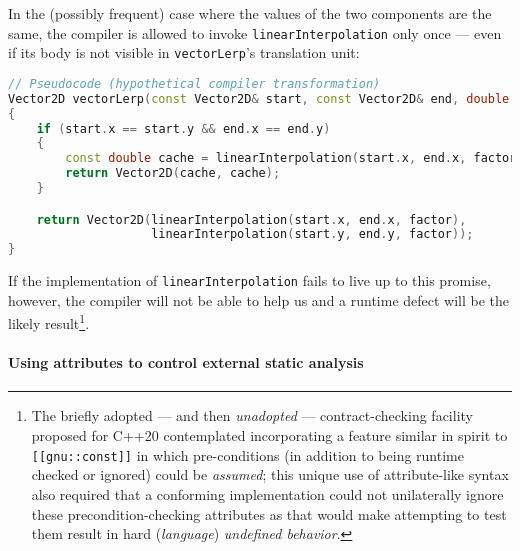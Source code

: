 \documentclass[twoside,10pt,letterpaper,usenames]{newstyle-PearsonGeneric-7-38}
\begin{document}
In the (possibly frequent) case where the values of the two components
are the same, the compiler is allowed to invoke
\texttt{linearInterpolation} only once --- even if its body is not
visible in \texttt{vectorLerp}'s translation unit:

\begin{lstlisting}[language=C++]
// Pseudocode (hypothetical compiler transformation)
Vector2D vectorLerp(const Vector2D& start, const Vector2D& end, double factor)
{
    if (start.x == start.y && end.x == end.y)
    {
        const double cache = linearInterpolation(start.x, end.x, factor);
        return Vector2D(cache, cache);
    }

    return Vector2D(linearInterpolation(start.x, end.x, factor),
                    linearInterpolation(start.y, end.y, factor));
}
\end{lstlisting}
    

If the implementation of \texttt{linearInterpolation} fails to live up
to this promise, however, the compiler will not be able to help us and a
runtime defect will be the likely result{\cprotect\footnote{The briefly
adopted --- and then \emph{unadopted} --- contract-checking facility
proposed for C++20 contemplated incorporating a feature similar in
spirit to \texttt{[[gnu::const]]} in which pre-conditions (in addition
to being runtime checked or ignored) could be \emph{assumed}; this
unique use of attribute-like syntax also required that a conforming
implementation could not unilaterally ignore these
precondition-checking attributes as that would make attempting to test
them result in hard (\emph{language}) \emph{undefined behavior}.}}.

\paragraph[Using attributes to control external static analysis]{Using attributes to control external static analysis}\label{using-attributes-to-control-external-static-analysis}
\end{document}
